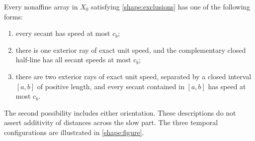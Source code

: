 \begin{proposition}\label{shape:classification}
Every nonaffine array in $X_0$ satisfying \cref{shape:exclusions} has one
of the following forms:
\begin{enumerate}
\item every secant has speed at most $c_b$;
\item there is one exterior ray of exact unit speed, and the complementary
closed half-line has all secant speeds at most $c_b$;
\item there are two exterior rays of exact unit speed, separated by a
closed interval $[a,b]$ of positive length, and every secant contained in
$[a,b]$ has speed at most $c_b$.
\end{enumerate}
The second possibility includes either orientation.  These descriptions
do not assert additivity of distances across the slow part.
The three temporal configurations are illustrated in \cref{shape:figure}.
\end{proposition}

